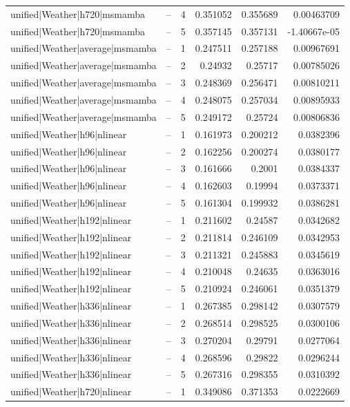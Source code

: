 \begin{longtable}{llrrrr}
unified|Weather|h720|msmamba & -- & 4 & 0.351052 & 0.355689 & 0.00463709 \\
unified|Weather|h720|msmamba & -- & 5 & 0.357145 & 0.357131 & -1.40667e-05 \\
unified|Weather|average|msmamba & -- & 1 & 0.247511 & 0.257188 & 0.00967691 \\
unified|Weather|average|msmamba & -- & 2 & 0.24932 & 0.25717 & 0.00785026 \\
unified|Weather|average|msmamba & -- & 3 & 0.248369 & 0.256471 & 0.00810211 \\
unified|Weather|average|msmamba & -- & 4 & 0.248075 & 0.257034 & 0.00895933 \\
unified|Weather|average|msmamba & -- & 5 & 0.249172 & 0.25724 & 0.00806836 \\
unified|Weather|h96|nlinear & -- & 1 & 0.161973 & 0.200212 & 0.0382396 \\
unified|Weather|h96|nlinear & -- & 2 & 0.162256 & 0.200274 & 0.0380177 \\
unified|Weather|h96|nlinear & -- & 3 & 0.161666 & 0.2001 & 0.0384337 \\
unified|Weather|h96|nlinear & -- & 4 & 0.162603 & 0.19994 & 0.0373371 \\
unified|Weather|h96|nlinear & -- & 5 & 0.161304 & 0.199932 & 0.0386281 \\
unified|Weather|h192|nlinear & -- & 1 & 0.211602 & 0.24587 & 0.0342682 \\
unified|Weather|h192|nlinear & -- & 2 & 0.211814 & 0.246109 & 0.0342953 \\
unified|Weather|h192|nlinear & -- & 3 & 0.211321 & 0.245883 & 0.0345619 \\
unified|Weather|h192|nlinear & -- & 4 & 0.210048 & 0.24635 & 0.0363016 \\
unified|Weather|h192|nlinear & -- & 5 & 0.210924 & 0.246061 & 0.0351379 \\
unified|Weather|h336|nlinear & -- & 1 & 0.267385 & 0.298142 & 0.0307579 \\
unified|Weather|h336|nlinear & -- & 2 & 0.268514 & 0.298525 & 0.0300106 \\
unified|Weather|h336|nlinear & -- & 3 & 0.270204 & 0.29791 & 0.0277064 \\
unified|Weather|h336|nlinear & -- & 4 & 0.268596 & 0.29822 & 0.0296244 \\
unified|Weather|h336|nlinear & -- & 5 & 0.267316 & 0.298355 & 0.0310392 \\
unified|Weather|h720|nlinear & -- & 1 & 0.349086 & 0.371353 & 0.0222669 \\

\end{longtable}
